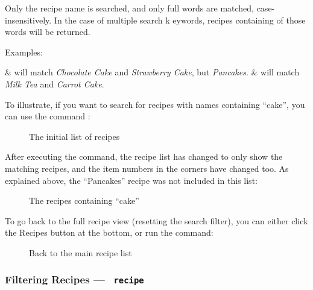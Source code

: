 	Only the recipe name is searched, and only full words are matched, case-insensitively. In the case of multiple search k
	eywords, recipes containing  of those words will be returned.

	Examples:
	\begin{bulletlist}
		&  will match \emph{Chocolate Cake} and \emph{Strawberry Cake}, but  \emph{Pancakes}.
		&  will match \emph{Milk Tea} and \emph{Carrot Cake}.
	\end{bulletlist}


	To illustrate, if you want to search for recipes with names containing \enquote{cake}, you can use the command :

	\begin{figure}[!htbp]\centering\ContinuedFloat*
		\caption{The initial list of recipes}
	\end{figure}

	After executing the command, the recipe list has changed to only show the matching recipes, and the item numbers
	in the corners have changed too. As explained above, the \enquote{Pancakes} recipe was not included in this list:
	\vspace{-1em} %

	\begin{figure}[!htbp]\centering\ContinuedFloat
		\caption{The recipes containing \enquote{cake}}
	\end{figure}

	\vspace{-1.5em} %
	To go back to the full recipe view (resetting the search filter), you can either click the Recipes button at the bottom, or run the
	 command:

	\vspace{-1.5em} %
	\begin{figure}[!htbp]\centering\ContinuedFloat
		\caption{Back to the main recipe list}
	\end{figure}
	\vspace{-3em} %









\hypertarget{FilterRecipeCommand}{}
\subsubsection{Filtering Recipes — \texttt{ recipe}}

